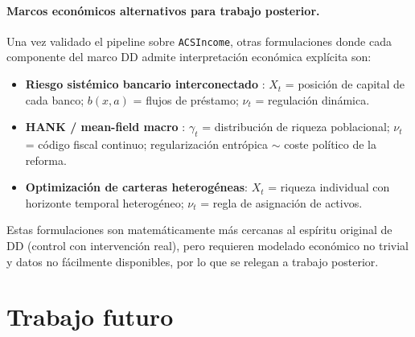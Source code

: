 \documentclass[11pt, a4paper]{article}
\theoremstyle{definition}
\begin{document}
\paragraph{Marcos económicos alternativos para trabajo posterior.}
Una vez validado el pipeline sobre \texttt{ACSIncome}, otras
formulaciones donde cada componente del marco DD admite
interpretación económica explícita son:
\begin{itemize}
  \item \textbf{Riesgo sistémico bancario interconectado}
        \cite{CarmonaFouqueSun2015}: $X_t$ = posición de capital de
        cada banco; $b(x, a)$ = flujos de préstamo; $\nu_t$ =
        regulación dinámica.
  \item \textbf{HANK / mean-field macro}
        \cite{AchdouLasryLionsMoll2022}: $\gamma_t$ = distribución
        de riqueza poblacional; $\nu_t$ = código fiscal continuo;
        regularización entrópica $\sim$ coste político de la
        reforma.
  \item \textbf{Optimización de carteras heterogéneas}: $X_t$ =
        riqueza individual con horizonte temporal heterogéneo;
        $\nu_t$ = regla de asignación de activos.
\end{itemize}
Estas formulaciones son matemáticamente más cercanas al espíritu
original de DD (control con intervención real), pero requieren
modelado económico no trivial y datos no fácilmente disponibles,
por lo que se relegan a trabajo posterior.

\section{Trabajo futuro}
\label{sec:trabajo-futuro}
\end{document}
